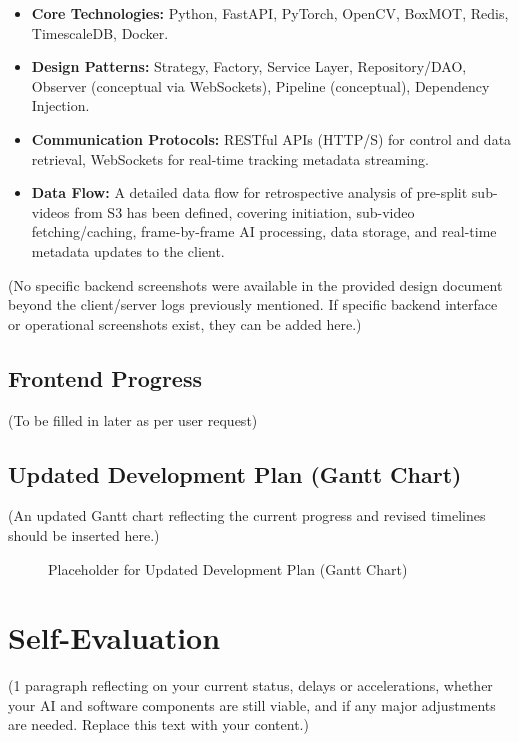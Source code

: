\begin{itemize}
    \item \textbf{Core Technologies:} Python, FastAPI, PyTorch, OpenCV, BoxMOT, Redis, TimescaleDB, Docker.
    \item \textbf{Design Patterns:} Strategy, Factory, Service Layer, Repository/DAO, Observer (conceptual via WebSockets), Pipeline (conceptual), Dependency Injection.
    \item \textbf{Communication Protocols:} RESTful APIs (HTTP/S) for control and data retrieval, WebSockets for real-time tracking metadata streaming.
    \item \textbf{Data Flow:} A detailed data flow for retrospective analysis of pre-split sub-videos from S3 has been defined, covering initiation, sub-video fetching/caching, frame-by-frame AI processing, data storage, and real-time metadata updates to the client.
\end{itemize}
(No specific backend screenshots were available in the provided design document beyond the client/server logs previously mentioned. If specific backend interface or operational screenshots exist, they can be added here.)

\subsection*{Frontend Progress}
\label{subsec:progress_frontend}
(To be filled in later as per user request)

\subsection*{Updated Development Plan (Gantt Chart)}
\label{subsec:progress_updated_plan}
(An updated Gantt chart reflecting the current progress and revised timelines should be inserted here.)
\begin{figure}[!htb]
    \centering
    \caption{Placeholder for Updated Development Plan (Gantt Chart)}
    \label{fig:progress_gantt_chart_placeholder}
\end{figure}
\clearpage

\section*{Self-Evaluation}
\label{sec:progress_self_evaluation}
(1 paragraph reflecting on your current status, delays or accelerations, whether your AI and software components are still viable, and if any major adjustments are needed. Replace this text with your content.)

